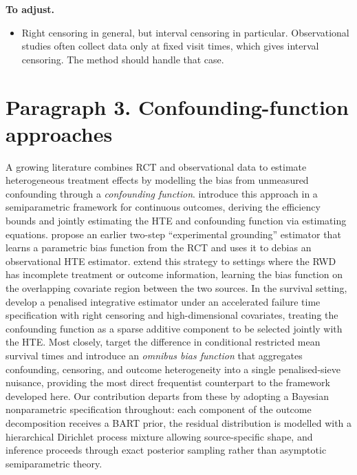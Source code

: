 \textbf{To adjust.}
\begin{itemize}
  \item Right censoring in general, but interval censoring in particular.
        Observational studies often collect data only at fixed visit times, which gives interval censoring.
        The method should handle that case.
\end{itemize}



\newpage
\section*{Paragraph 3. Confounding-function approaches}

A growing literature combines RCT and observational data to estimate heterogeneous treatment effects by modelling the bias from unmeasured confounding through a \emph{confounding function}.
\citet{YangLiuZengWang2025} introduce this approach in a semiparametric framework for continuous outcomes, deriving the efficiency bounds and jointly estimating the HTE and confounding function via estimating equations.
\citet{Kallus2018} propose an earlier two-step ``experimental grounding'' estimator that learns a parametric bias function from the RCT and uses it to debias an observational HTE estimator.
\citet{Yao2024} extend this strategy to settings where the RWD has incomplete treatment or outcome information, learning the bias function on the overlapping covariate region between the two sources.
In the survival setting, \citet{Ye2025} develop a penalised integrative estimator under an accelerated failure time specification with right censoring and high-dimensional covariates, treating the confounding function as a sparse additive component to be selected jointly with the HTE.
Most closely, \citet{mao2025statistical} target the difference in conditional restricted mean survival times and introduce an \emph{omnibus bias function} that aggregates confounding, censoring, and outcome heterogeneity into a single penalised-sieve nuisance, providing the most direct frequentist counterpart to the framework developed here.
Our contribution departs from these by adopting a Bayesian nonparametric specification throughout: each component of the outcome decomposition receives a BART prior, the residual distribution is modelled with a hierarchical Dirichlet process mixture allowing source-specific shape, and inference proceeds through exact posterior sampling rather than asymptotic semiparametric theory.

